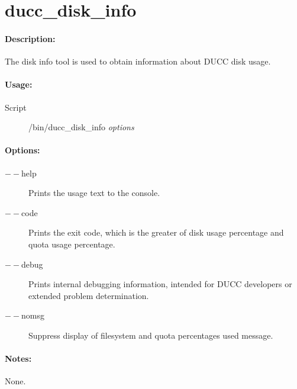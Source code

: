 % 
% 
% 
% 
\ifpdf
\else
{}
\fi
    \section{ducc\_disk\_info}
    \label{sec:cli.tools-ducc-disk-info}    

  \paragraph{Description:}
    The disk info tool is used to obtain information about DUCC disk usage. 
    
  \paragraph{Usage:}
    \begin{description}
    \item[Script] \ducchome/bin/ducc\_disk\_info {\em options}
    \end{description}
    
    \paragraph{Options:}
    \begin{description}
    	\item[$--$help]
          Prints the usage text to the console. 
        \item[$--$code]
          Prints the exit code, which is the greater of disk usage percentage and quota usage percentage. 
        \item[$--$debug ]          
          Prints internal debugging information, intended for DUCC developers or extended problem determination.
        \item[$--$nomsg ]          
          Suppress display of filesystem and quota percentages used message.                                                                                               
     \end{description}
        
    \paragraph{Notes:}
    None.
    